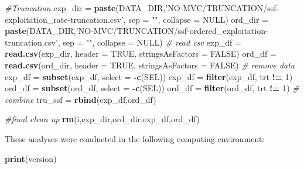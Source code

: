 \documentclass[]{book}
\newenvironment{Shaded}{\begin{snugshade}}{\end{snugshade}}
\newcommand{\CommentTok}[1]{\textcolor[rgb]{0.56,0.35,0.01}{\textit{#1}}}
\newcommand{\DataTypeTok}[1]{\textcolor[rgb]{0.13,0.29,0.53}{#1}}
\newcommand{\DecValTok}[1]{\textcolor[rgb]{0.00,0.00,0.81}{#1}}
\newcommand{\KeywordTok}[1]{\textcolor[rgb]{0.13,0.29,0.53}{\textbf{#1}}}
\newcommand{\NormalTok}[1]{#1}
\newcommand{\OperatorTok}[1]{\textcolor[rgb]{0.81,0.36,0.00}{\textbf{#1}}}
\newcommand{\OtherTok}[1]{\textcolor[rgb]{0.56,0.35,0.01}{#1}}
\newcommand{\StringTok}[1]{\textcolor[rgb]{0.31,0.60,0.02}{#1}}
\begin{document}
\begin{Shaded}
\begin{Highlighting}[]
\CommentTok{#Truncation}
\NormalTok{exp_dir =}\StringTok{ }\KeywordTok{paste}\NormalTok{(DATA_DIR,}\StringTok{'NO-MVC/TRUNCATION/ssf-exploitation_rate-truncation.csv'}\NormalTok{, }\DataTypeTok{sep =} \StringTok{""}\NormalTok{, }\DataTypeTok{collapse =} \OtherTok{NULL}\NormalTok{)}
\NormalTok{ord_dir =}\StringTok{ }\KeywordTok{paste}\NormalTok{(DATA_DIR,}\StringTok{'NO-MVC/TRUNCATION/ssf-ordered_exploitation-truncation.csv'}\NormalTok{, }\DataTypeTok{sep =} \StringTok{""}\NormalTok{, }\DataTypeTok{collapse =} \OtherTok{NULL}\NormalTok{)}
\CommentTok{# read csv}
\NormalTok{exp_df =}\StringTok{ }\KeywordTok{read.csv}\NormalTok{(exp_dir, }\DataTypeTok{header =} \OtherTok{TRUE}\NormalTok{, }\DataTypeTok{stringsAsFactors =} \OtherTok{FALSE}\NormalTok{)}
\NormalTok{ord_df =}\StringTok{ }\KeywordTok{read.csv}\NormalTok{(ord_dir, }\DataTypeTok{header =} \OtherTok{TRUE}\NormalTok{, }\DataTypeTok{stringsAsFactors =} \OtherTok{FALSE}\NormalTok{)}
\CommentTok{# remove data}
\NormalTok{exp_df =}\StringTok{ }\KeywordTok{subset}\NormalTok{(exp_df, }\DataTypeTok{select =} \OperatorTok{-}\KeywordTok{c}\NormalTok{(SEL))}
\NormalTok{exp_df =}\StringTok{ }\KeywordTok{filter}\NormalTok{(exp_df, trt }\OperatorTok{!=}\StringTok{ }\DecValTok{1}\NormalTok{)}
\NormalTok{ord_df =}\StringTok{ }\KeywordTok{subset}\NormalTok{(ord_df, }\DataTypeTok{select =} \OperatorTok{-}\KeywordTok{c}\NormalTok{(SEL))}
\NormalTok{ord_df =}\StringTok{ }\KeywordTok{filter}\NormalTok{(ord_df, trt }\OperatorTok{!=}\StringTok{ }\DecValTok{1}\NormalTok{)}
\CommentTok{# combine}
\NormalTok{tru_ssf =}\StringTok{ }\KeywordTok{rbind}\NormalTok{(exp_df,ord_df)}

\CommentTok{#final clean up}
\KeywordTok{rm}\NormalTok{(i,exp_dir,ord_dir,exp_df,ord_df)}
\end{Highlighting}
\end{Shaded}

These analyses were conducted in the following computing environment:

\begin{Shaded}
\begin{Highlighting}[]
\KeywordTok{print}\NormalTok{(version)}
\end{Highlighting}
\end{Shaded}
\end{document}
